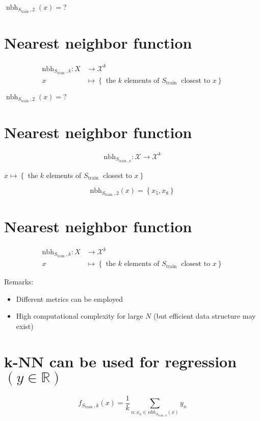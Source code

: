 $\operatorname{nbh}_{S_{\text {train }}, 2}(x)=?$

\section*{Nearest neighbor function}
$$
\begin{aligned}
\mathrm{nbh}_{S_{\text {train }}, k}: X & \rightarrow \mathscr{X}^{k} \\
x & \mapsto\left\{\text { the } k \text { elements of } S_{\text {train }} \text { closest to } x\right\}
\end{aligned}
$$


$\operatorname{nbh}_{S_{\text {train }}, 2}(x)=?$

\section*{Nearest neighbor function}
$$
\mathrm{nbh}_{S_{\text {train }, k}}: \mathscr{X} \rightarrow \mathscr{X}^{k}
$$

$x \mapsto\left\{\right.$ the $k$ elements of $S_{\text {train }}$ closest to $\left.x\right\}$


$$
\mathrm{nbh}_{S_{\text {train }}, 2}(x)=\left\{x_{5}, x_{8}\right\}
$$

\section*{Nearest neighbor function}
$$
\begin{aligned}
\mathrm{nbh}_{S_{\text {train }}, k}: X & \rightarrow \mathscr{X}^{k} \\
x & \mapsto\left\{\text { the } k \text { elements of } S_{\text {train }} \text { closest to } x\right\}
\end{aligned}
$$


Remarks:

\begin{itemize}
  \item Different metrics can be employed
  \item High computational complexity for large $N$ (but efficient data structure may exist)
\end{itemize}

\section*{k-NN can be used for regression $(y \in \mathbb{R})$}
$$
f_{S_{\text {train }}, k}(x)=\frac{1}{k} \sum_{n: x_{n} \in n b h_{S_{\text {train }, k}}(x)} y_{n}
$$


